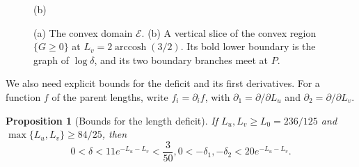 \documentclass[10pt,twoside]{article}
\theoremstyle{plain}
\newtheorem{proposition}[theorem]{Proposition}
\theoremstyle{definition}
\theoremstyle{remark}
\DeclareMathOperator{\arccosh}{arccosh}
\begin{document}
\begin{figure}[ht]
\begin{minipage}[b]{0.58\textwidth}
\par\small (b)
\end{minipage}
\caption{(a) The convex domain $\mathcal E$.
(b) A vertical slice of the convex region $\{G\geq0\}$
at $L_v=2\arccosh(3/2)$.
Its bold lower boundary is the graph of $\log\delta$,
and its two boundary branches meet at $P$.}
\label{fig:deficit-domains}
\end{figure}

We also need explicit bounds for the deficit and its first derivatives.
For a function $f$ of the parent lengths, write
$f_i=\partial_i f$, with $\partial_1=\partial/\partial L_u$
and $\partial_2=\partial/\partial L_v$.

\begin{proposition}[Bounds for the length deficit]
\label{prop:scalar-defect}
If $L_u,L_v\geq L_0=236/125$ and $\max\{L_u,L_v\}\geq84/25$,
then
$$
0<\delta<11e^{-L_u-L_v}<\frac3{50},
0<-\delta_1,-\delta_2<20e^{-L_u-L_v}.
$$
\end{proposition}
\end{document}
